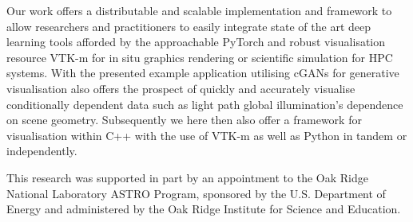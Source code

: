 \documentclass[sigconf,authordraft]{acmart}%
\begin{document}
Our work offers a distributable and scalable implementation and framework to allow researchers and practitioners to easily integrate state of the art deep learning tools afforded by the approachable PyTorch and robust visualisation resource VTK-m for in situ graphics rendering or scientific simulation for HPC systems. With the presented example application utilising cGANs for generative visualisation also offers the prospect of quickly and accurately visualise conditionally dependent data such as light path global illumination's dependence on scene geometry. Subsequently we here then also offer a framework for visualisation within C++ with the use of VTK-m as well as Python in tandem or independently. 


\begin{acks}
 This research was supported in part by an appointment to the Oak Ridge National Laboratory ASTRO Program, sponsored by the U.S. Department of Energy and administered by the Oak Ridge Institute for Science and Education.
\end{acks}




\end{document}
